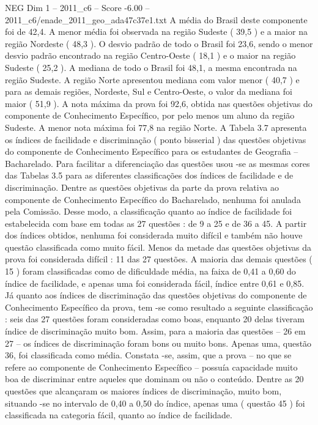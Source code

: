 \begin{textsample}{NEG Dim 1 – 2011\_c6 – Score -6.00 – 2011\_c6/enade\_2011\_geo\_ada47c37e1.txt}
A média do Brasil deste componente foi de 42,4.
A menor média foi observada na região Sudeste ( 39,5 ) e a maior na região Nordeste ( 48,3 ).
O desvio padrão de todo o Brasil foi 23,6, sendo o menor desvio padrão encontrado na região Centro-Oeste ( 18,1 ) e o maior na região Sudeste ( 25,2 ).
A mediana de todo o Brasil foi 48,1, a mesma encontrada na região Sudeste.
A região Norte apresentou mediana com valor menor ( 40,7 ) e para as demais regiões, Nordeste, Sul e Centro-Oeste, o valor da mediana foi maior ( 51,9 ).
A nota máxima da prova foi 92,6, obtida nas questões objetivas do componente de Conhecimento Específico, por pelo menos um aluno da região Sudeste.
A menor nota máxima foi 77,8 na região Norte.
A Tabela 3.7 apresenta os índices de facilidade e discriminação ( ponto bisserial ) das questões objetivas do componente de Conhecimento Específico para os estudantes de Geografia – Bacharelado.
Para facilitar a diferenciação das questões usou -se as mesmas cores das Tabelas 3.5 para as diferentes classificações dos índices de facilidade e de discriminação.
Dentre as questões objetivas da parte da prova relativa ao componente de Conhecimento Específico do Bacharelado, nenhuma foi anulada pela Comissão.
Desse modo, a classificação quanto ao índice de facilidade foi estabelecida com base em todas as 27 questões : de 9 a 25 e de 36 a 45.
A partir dos índices obtidos, nenhuma foi considerada muito difícil e também não houve questão classificada como muito fácil.
Menos da metade das questões objetivas da prova foi considerada difícil : 11 das 27 questões.
A maioria das demais questões ( 15 ) foram classificadas como de dificuldade média, na faixa de 0,41 a 0,60 do índice de facilidade, e apenas uma foi considerada fácil, índice entre 0,61 e 0,85.
Já quanto aos índices de discriminação das questões objetivas do componente de Conhecimento Específico da prova, tem -se como resultado a seguinte classificação : seis das 27 questões foram consideradas como boas, enquanto 20 delas tiveram índice de discriminação muito bom.
Assim, para a maioria das questões – 26 em 27 – os índices de discriminação foram bons ou muito bons.
Apenas uma, questão 36, foi classificada como média.
Constata -se, assim, que a prova – no que se refere ao componente de Conhecimento Específico – possuía capacidade muito boa de discriminar entre aqueles que dominam ou não o conteúdo.
Dentre as 20 questões que alcançaram os maiores índices de discriminação, muito bom, situando -se no intervalo de 0,40 a 0,50 do índice, apenas uma ( questão 45 ) foi classificada na categoria fácil, quanto ao índice de facilidade.

\end{textsample}

